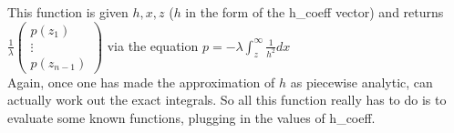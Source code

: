 This function is given $h,x,z$ ($h$ in the form of the h\_coeff vector)
and returns 
$\displaystyle \frac{1}{\lambda} \left( \begin{array}{c} p(z_1) \\ \vdots \\
p(z_{n-1}) \end{array} \right) $ via the equation $\displaystyle p =-\lambda
 \int_z^{\infty} \frac{1}{h^2} dx$
\\

Again, once one has made the approximation of $h$ as piecewise analytic, can 
actually work out the exact integrals. So all this function really has to do
is to evaluate some known functions, plugging in the values of h\_coeff.

